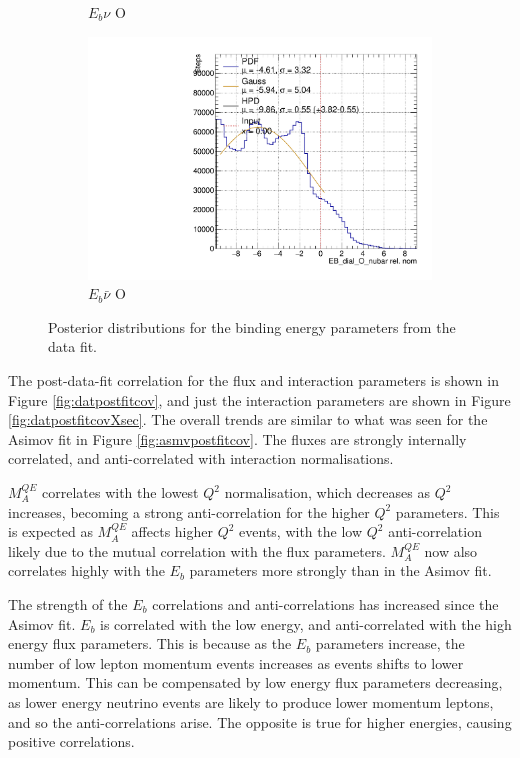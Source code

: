 \begin{figure}[!htbp]
\begin{subfigure}{.48\textwidth}
  \caption{$E_{b}\nu$ O}
\end{subfigure}
\begin{subfigure}{.48\textwidth}
  \centering
  \includegraphics[width=0.73\linewidth]{figs/EB_dial_O_nubarDataPoly}
  \caption{$E_{b}\bar{\nu}$ O}
\end{subfigure}
\caption{Posterior distributions for the binding energy parameters from the data fit.}
\label{fig:Ebdatares}
\end{figure}

The post-data-fit correlation for the flux and interaction parameters is shown in Figure \ref{fig:datpostfitcov}, and just the interaction parameters are shown in Figure \ref{fig:datpostfitcovXsec}. The overall trends are similar to what was seen for the Asimov fit in Figure \ref{fig:asmvpostfitcov}. The fluxes are strongly internally correlated, and anti-correlated with interaction normalisations. 

$M^{QE}_A$ correlates with the lowest $Q^2$ normalisation, which decreases as $Q^2$ increases, becoming a strong anti-correlation for the higher $Q^2$ parameters. This is expected as $M^{QE}_A$ affects higher $Q^2$ events, with the low $Q^2$ anti-correlation likely due to the mutual correlation with the flux parameters. $M^{QE}_A$ now also correlates highly with the $E_b$ parameters more strongly than in the Asimov fit.

The strength of the $E_b$ correlations and anti-correlations has increased since the Asimov fit. $E_b$ is correlated with the low energy, and anti-correlated with the high energy flux parameters. This is because as the $E_b$ parameters increase, the number of low lepton momentum events increases as events shifts to lower momentum. This can be compensated by low energy flux parameters decreasing, as lower energy neutrino events are likely to produce lower momentum leptons, and so the anti-correlations arise. The opposite is true for higher energies, causing positive correlations.

